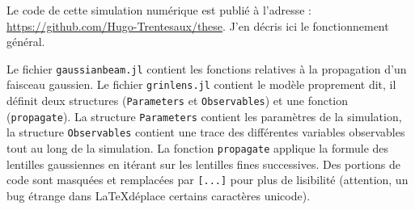 Le code de cette simulation numérique est publié à l'adresse :
\\ \href{https://github.com/Hugo-Trentesaux/these}{https://github.com/Hugo-Trentesaux/these}.
J'en décris ici le fonctionnement général.

Le fichier \verb|gaussianbeam.jl| contient les fonctions relatives à la propagation d'un faisceau gaussien. Le fichier \verb|grinlens.jl| contient le modèle proprement dit, il définit deux structures (\verb|Parameters| et \verb|Observables|) et une fonction (\verb|propagate|). La structure \verb|Parameters| contient les paramètres de la simulation, la structure \verb|Observables| contient une trace des différentes variables observables tout au long de la simulation. La fonction \verb|propagate| applique la formule des lentilles gaussiennes en itérant sur les lentilles fines successives. Des portions de code sont masquées et remplacées par \verb|[...]| pour plus de lisibilité (attention, un bug étrange dans \LaTeX déplace certains caractères unicode).

